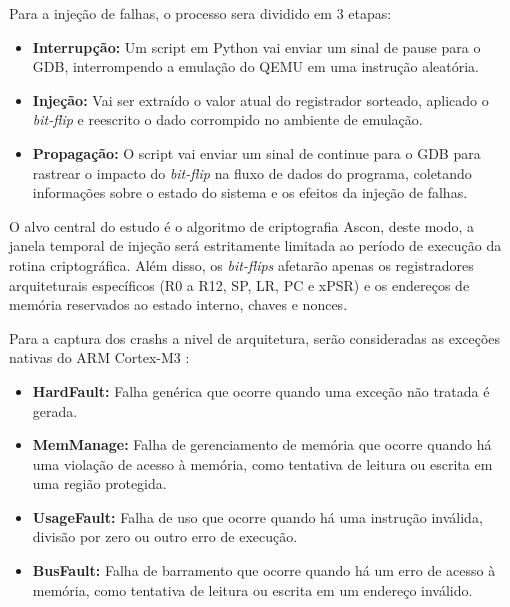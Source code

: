\documentclass[12pt,a4paper]{article}
\begin{document}
Para a injeção de falhas, o processo sera dividido em 3 etapas: 
\begin{itemize}
    \item \textbf{Interrupção:} Um script em Python vai enviar um sinal de pause para o GDB, interrompendo a emulação do QEMU em uma instrução aleatória. 
    \item \textbf{Injeção:} Vai ser extraído o valor atual do registrador sorteado, aplicado o \textit{bit-flip} e reescrito o dado corrompido no ambiente de emulação.
    \item \textbf{Propagação:} O script vai enviar um sinal de continue para o GDB para rastrear o impacto do \textit{bit-flip} na fluxo de dados do programa, coletando informações sobre o estado do sistema e os efeitos da injeção de falhas.
\end{itemize}

O alvo central do estudo é o algoritmo de criptografia Ascon, deste modo, a janela temporal de injeção será estritamente limitada ao período de execução da rotina criptográfica. Além disso, os \textit{bit-flips} afetarão apenas os registradores arquiteturais específicos (R0 a R12, SP, LR, PC e xPSR) e os endereços de memória reservados ao estado interno, chaves e nonces.

Para a captura dos crashs a nivel de arquitetura, serão consideradas as exceções nativas do ARM Cortex-M3 \cite{arm:cortex_m3:exceptions}:
\begin{itemize}
    \item \textbf{HardFault:} Falha genérica que ocorre quando uma exceção não tratada é gerada.
    \item \textbf{MemManage:} Falha de gerenciamento de memória que ocorre quando há uma violação de acesso à memória, como tentativa de leitura ou escrita em uma região protegida.
    \item \textbf{UsageFault:} Falha de uso que ocorre quando há uma instrução inválida, divisão por zero ou outro erro de execução.
    \item \textbf{BusFault:} Falha de barramento que ocorre quando há um erro de acesso à memória, como tentativa de leitura ou escrita em um endereço inválido.
\end{itemize}

\printbibliography[title={Referências Bibliográficas}]
\end{document}
